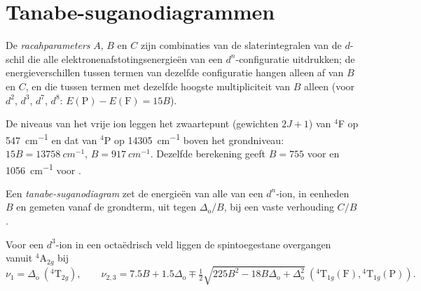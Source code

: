 \section{Tanabe-suganodiagrammen}

\begin{definition}[Racahparameters]\label{def:b3:complex-spectra-magnetism:racah}
De \emph{racahparameters} $A$, $B$ en $C$ zijn combinaties van
de slaterintegralen van de $d$-schil die alle elektronenafstotingsenergieën
van een $d^n$-configuratie uitdrukken; de energieverschillen tussen termen van
dezelfde configuratie hangen alleen af van $B$ en $C$, en die tussen termen met
dezelfde hoogste multipliciteit van $B$ alleen (voor $d^2$, $d^3$, $d^7$, $d^8$: $E(\mathrm P) - E(\mathrm F) = 15B$).
\end{definition}

\begin{example}\label{ex:b3:complex-spectra-magnetism:free-B}
De niveaus van het vrije ion  leggen het zwaartepunt (gewichten $2J + 1$) van $^4$F op
\qty{547}{cm^{-1}} en dat van $^4$P op \qty{14305}{cm^{-1}} boven het grondniveau: $15B = \qty{13758}{cm^{-1}}$,
$B = \qty{917}{cm^{-1}}$. Dezelfde berekening geeft $B = 755$ voor  en \qty{1056}{cm^{-1}} voor
.
\end{example}

\begin{definition}\label{def:b3:complex-spectra-magnetism:tanabe-sugano}
Een \emph{tanabe-suganodiagram} zet de
energieën van alle  van een $d^n$-ion, in eenheden $B$ en gemeten vanaf de
grondterm, uit tegen $\Delta_{\mathrm o}/B$, bij een vaste verhouding $C/B$.
\end{definition}

\begin{proposition}\label{prop:b3:complex-spectra-magnetism:d3-bands}
Voor een $d^3$-ion in een octaëdrisch veld liggen de spintoegestane overgangen vanuit $^4$A$_{2g}$ bij
\[
  \nu_1 = \Delta_{\mathrm o}\ (^4\mathrm T_{2g}), \qquad
  \nu_{2,3} = 7.5B + 1.5\Delta_{\mathrm o} \mp \tfrac12\sqrt{225B^2 - 18B\Delta_{\mathrm o} + \Delta_{\mathrm o}^2}\ (^4\mathrm T_{1g}(\mathrm F), {}^4\mathrm T_{1g}(\mathrm P)).
\]
\end{proposition}

